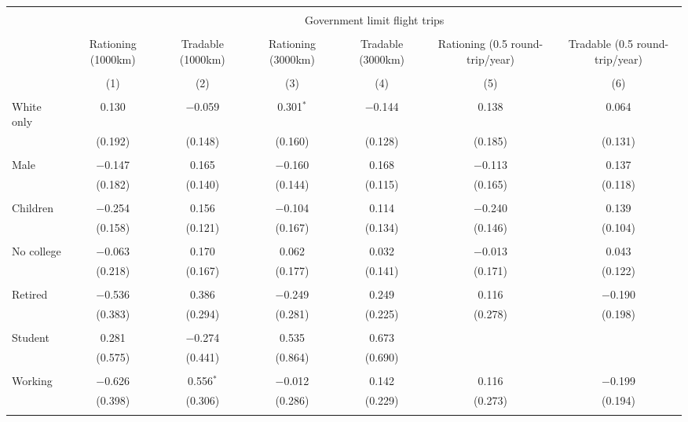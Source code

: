 
\begin{tabular}{@{\extracolsep{5pt}}lcccccc} 
\\[-1.8ex]\hline 
\hline \\[-1.8ex] 
 & \multicolumn{6}{c}{Government limit flight trips} \\ 
\cline{2-7} 
\\[-1.8ex] & Rationing (1000km) & Tradable (1000km) & Rationing (3000km) & Tradable (3000km) & Rationing (0.5 round-trip/year) & Tradable (0.5 round-trip/year) \\ 
\\[-1.8ex] & (1) & (2) & (3) & (4) & (5) & (6)\\ 
\hline \\[-1.8ex] 
 White only & 0.130 & $-$0.059 & 0.301$^{*}$ & $-$0.144 & 0.138 & 0.064 \\ 
  & (0.192) & (0.148) & (0.160) & (0.128) & (0.185) & (0.131) \\ 
  & & & & & & \\ 
 Male & $-$0.147 & 0.165 & $-$0.160 & 0.168 & $-$0.113 & 0.137 \\ 
  & (0.182) & (0.140) & (0.144) & (0.115) & (0.165) & (0.118) \\ 
  & & & & & & \\ 
 Children & $-$0.254 & 0.156 & $-$0.104 & 0.114 & $-$0.240 & 0.139 \\ 
  & (0.158) & (0.121) & (0.167) & (0.134) & (0.146) & (0.104) \\ 
  & & & & & & \\ 
 No college & $-$0.063 & 0.170 & 0.062 & 0.032 & $-$0.013 & 0.043 \\ 
  & (0.218) & (0.167) & (0.177) & (0.141) & (0.171) & (0.122) \\ 
  & & & & & & \\ 
 Retired & $-$0.536 & 0.386 & $-$0.249 & 0.249 & 0.116 & $-$0.190 \\ 
  & (0.383) & (0.294) & (0.281) & (0.225) & (0.278) & (0.198) \\ 
  & & & & & & \\ 
 Student & 0.281 & $-$0.274 & 0.535 & 0.673 &  &  \\ 
  & (0.575) & (0.441) & (0.864) & (0.690) &  &  \\ 
  & & & & & & \\ 
 Working & $-$0.626 & 0.556$^{*}$ & $-$0.012 & 0.142 & 0.116 & $-$0.199 \\ 
  & (0.398) & (0.306) & (0.286) & (0.229) & (0.273) & (0.194) \\ 
  & & & & & & \\ 

\end{tabular}
